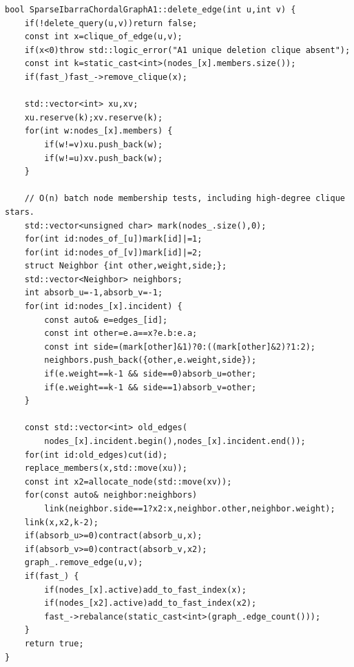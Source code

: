 \documentclass[11pt,a4paper,oneside]{report}
\theoremstyle{plain}
\theoremstyle{definition}
\theoremstyle{remark}
\newcommand{\op}[1]{\textsf{#1}}
\DeclareRobustCommand{\file}[1]{\mtp_breakable_tt:n {#1}}
\begin{document}
\begin{lstlisting}[style=cpp,firstnumber=219,caption={\file{src/sparse_ibarra_a1.cpp}, lines 219--266: \op{Delete} (\cref{alg:delete}).},label={lst:a1-delete}]
bool SparseIbarraChordalGraphA1::delete_edge(int u,int v) {
    if(!delete_query(u,v))return false;
    const int x=clique_of_edge(u,v);
    if(x<0)throw std::logic_error("A1 unique deletion clique absent");
    const int k=static_cast<int>(nodes_[x].members.size());
    if(fast_)fast_->remove_clique(x);

    std::vector<int> xu,xv;
    xu.reserve(k);xv.reserve(k);
    for(int w:nodes_[x].members) {
        if(w!=v)xu.push_back(w);
        if(w!=u)xv.push_back(w);
    }

    // O(n) batch node membership tests, including high-degree clique stars.
    std::vector<unsigned char> mark(nodes_.size(),0);
    for(int id:nodes_of_[u])mark[id]|=1;
    for(int id:nodes_of_[v])mark[id]|=2;
    struct Neighbor {int other,weight,side;};
    std::vector<Neighbor> neighbors;
    int absorb_u=-1,absorb_v=-1;
    for(int id:nodes_[x].incident) {
        const auto& e=edges_[id];
        const int other=e.a==x?e.b:e.a;
        const int side=(mark[other]&1)?0:((mark[other]&2)?1:2);
        neighbors.push_back({other,e.weight,side});
        if(e.weight==k-1 && side==0)absorb_u=other;
        if(e.weight==k-1 && side==1)absorb_v=other;
    }

    const std::vector<int> old_edges(
        nodes_[x].incident.begin(),nodes_[x].incident.end());
    for(int id:old_edges)cut(id);
    replace_members(x,std::move(xu));
    const int x2=allocate_node(std::move(xv));
    for(const auto& neighbor:neighbors)
        link(neighbor.side==1?x2:x,neighbor.other,neighbor.weight);
    link(x,x2,k-2);
    if(absorb_u>=0)contract(absorb_u,x);
    if(absorb_v>=0)contract(absorb_v,x2);
    graph_.remove_edge(u,v);
    if(fast_) {
        if(nodes_[x].active)add_to_fast_index(x);
        if(nodes_[x2].active)add_to_fast_index(x2);
        fast_->rebalance(static_cast<int>(graph_.edge_count()));
    }
    return true;
}
\end{lstlisting}
\end{document}
